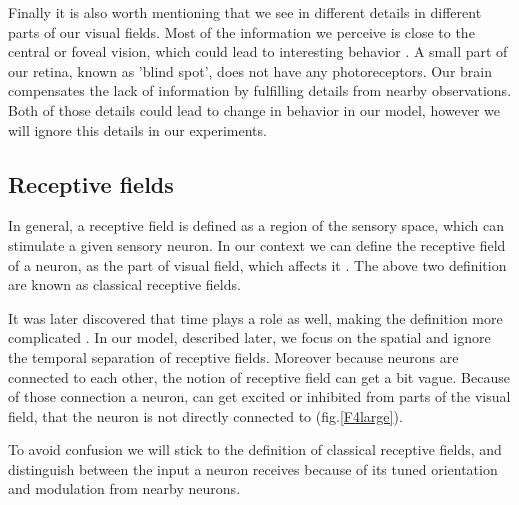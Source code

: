 Finally it is also worth mentioning that we see in different details in different parts of our visual fields. Most of the information we perceive is close to the central or foveal vision, which could lead to interesting behavior \cite{knight2008drastically}. A small part of our retina, known as 'blind spot', does not have any photoreceptors. Our brain compensates the lack of information by fulfilling details from nearby observations. Both of those details could lead to change in behavior in our model, however we will ignore this details in our experiments.


\subsection{Receptive fields}

In general, a receptive field is defined as a region of the sensory space, which can stimulate a given sensory neuron. In our context we can define the receptive field of a neuron, as the part of visual field, which affects it \cite{Hartline700}. The above two definition are known as classical receptive fields.

It was later discovered that time plays a role as well, making the definition more complicated \cite{deangelis1995receptive}. In our model, described later, we focus on the spatial and ignore the temporal separation of receptive fields. Moreover because neurons are connected to each other, the notion of receptive field can get a bit vague. Because of those connection a neuron, can get excited or inhibited from parts of the visual field, that the neuron is not directly connected to (fig.\ref{F4large}).

To avoid confusion we will stick to the definition of classical receptive fields, and distinguish between the input a neuron receives because of its tuned orientation and modulation from nearby neurons.


